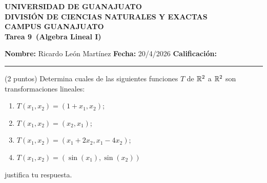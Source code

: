 \documentclass[12pt,a4paper]{article}
\newcommand{\alumno}{Ricardo León Martínez}
\newcommand{\materia}{Algebra Lineal I}
\newcommand{\tarea}{Tarea 9}
\newcommand{\fecha}{20/4/2026}
\begin{document}
    \begin{center}
        {\large\textbf{UNIVERSIDAD DE GUANAJUATO}}\\[0.3cm]
        {\normalsize\textbf{DIVISIÓN DE CIENCIAS NATURALES Y EXACTAS}}\\
        {\normalsize\textbf{CAMPUS GUANAJUATO}}\\[1cm]

        {\Large\textbf{\tarea\ (\materia)}}\\[1cm]
    \end{center}

    \noindent
    \textbf{Nombre:} \alumno 
    \hfill 
    \textbf{Fecha:} \fecha 
    \hfill 
    \textbf{Calificación:} \rule{3cm}{0.4pt}

    \vspace{0.3cm}

    \begin{mdframed}[style=mdpinkbox,frametitle={Ejercicio 1}]
        (2 puntos) Determina cuales de las siguientes funciones $T$ de $\mathbb{R}^{2}$ a $\mathbb{R}^{2}$ son
        transformaciones lineales:
        \begin{enumerate}
            \item[(a)] $T(x_{1},x_{2})=(1+x_{1},x_{2})$;
            \item[(b)] $T(x_{1},x_{2})=(x_{2},x_{1})$;
            \item[(c)] $T(x_{1},x_{2})=(x_{1}+2x_{2},x_{1}-4x_{2})$;
            \item[(d)] $T(x_{1},x_{2})=(\sin(x_{1}),\sin(x_{2}))$   
        \end{enumerate}
        justifica tu respuesta.
    \end{mdframed}
\end{document}
